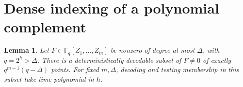 \documentclass[11pt,a4paper]{article}
\newcommand{\F}{\mathbb F}
\newtheorem{lemma}[theorem]{Lemma}
\theoremstyle{definition}
\theoremstyle{remark}
\numberwithin{equation}{section}
\begin{document}
\appendix
\section{Dense indexing of a polynomial complement}\label{sec:decoder}


\begin{lemma}\label{lem:decoder}
Let $F\in\F_q[Z_1,\ldots,Z_m]$ be nonzero of degree at most $\Delta$, with $q=2^h>\Delta$. There is a deterministically decodable subset of $F\ne0$ of exactly $q^{m-1}(q-\Delta)$ points. For fixed $m,\Delta$, decoding and testing membership in this subset take time polynomial in $h$.
\end{lemma}
\end{document}
